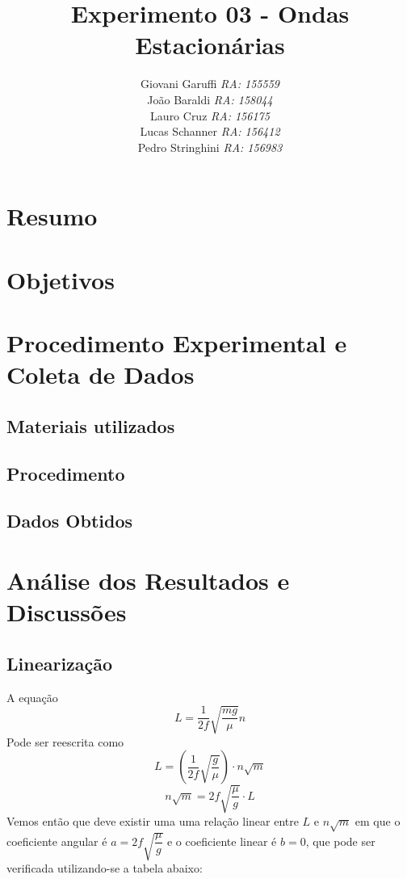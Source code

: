 \documentclass[12pt,a4paper]{article}
\begin{document}
\title{\vspace{70mm}\Huge Experimento 03 - Ondas Estacionárias}
\author{ Giovani Garuffi\qquad\hfill
		\textit {RA: 155559}\protect\\
		João Baraldi\hfill
		\textit{RA: 158044}\protect\\
		Lauro Cruz\hfill
		\textit{RA: 156175}\protect\\
		Lucas Schanner\hfill
		\textit{RA: 156412}\protect\\
		Pedro Stringhini\hfill
		\textit {RA: 156983}								
		}
\maketitle
\newpage
\section{Resumo}

\section{Objetivos}


\section{Procedimento Experimental e Coleta de Dados}

\subsection{Materiais utilizados}


\subsection{Procedimento}




\subsection{Dados Obtidos}







\section{Análise dos Resultados e Discussões}
\subsection{Linearização}
A equação
$$ L = \dfrac{1}{2f} \sqrt{\dfrac{mg}{\mu}} n $$
Pode ser reescrita como
$$ L = (\dfrac{1}{2f} \sqrt{\dfrac{g}{\mu}}) \cdot n\sqrt{m} $$
$$ n \sqrt{m} = 2f\sqrt{\frac{\mu}{g}} \cdot L $$
Vemos então que deve existir uma uma relação linear entre $L$ e $n\sqrt{m}$ em que o coeficiente angular é $a = 2f \sqrt{\dfrac{\mu}{g}}$ e o coeficiente linear é $b = 0$, que pode ser verificada utilizando-se a tabela abaixo:
\end{document}
